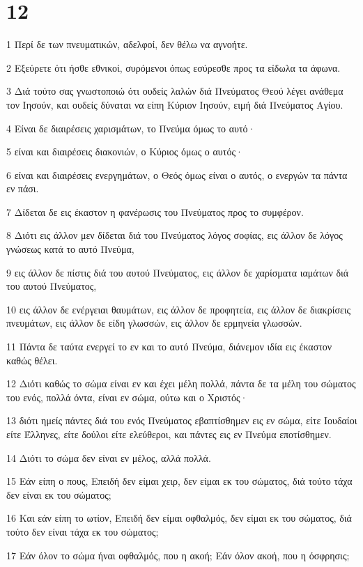 \chapter{12}

\par 1 Περί δε των πνευματικών, αδελφοί, δεν θέλω να αγνοήτε.
\par 2 Εξεύρετε ότι ήσθε εθνικοί, συρόμενοι όπως εσύρεσθε προς τα είδωλα τα άφωνα.
\par 3 Διά τούτο σας γνωστοποιώ ότι ουδείς λαλών διά Πνεύματος Θεού λέγει ανάθεμα τον Ιησούν, και ουδείς δύναται να είπη Κύριον Ιησούν, ειμή διά Πνεύματος Αγίου.
\par 4 Είναι δε διαιρέσεις χαρισμάτων, το Πνεύμα όμως το αυτό·
\par 5 είναι και διαιρέσεις διακονιών, ο Κύριος όμως ο αυτός·
\par 6 είναι και διαιρέσεις ενεργημάτων, ο Θεός όμως είναι ο αυτός, ο ενεργών τα πάντα εν πάσι.
\par 7 Δίδεται δε εις έκαστον η φανέρωσις του Πνεύματος προς το συμφέρον.
\par 8 Διότι εις άλλον μεν δίδεται διά του Πνεύματος λόγος σοφίας, εις άλλον δε λόγος γνώσεως κατά το αυτό Πνεύμα,
\par 9 εις άλλον δε πίστις διά του αυτού Πνεύματος, εις άλλον δε χαρίσματα ιαμάτων διά του αυτού Πνεύματος,
\par 10 εις άλλον δε ενέργειαι θαυμάτων, εις άλλον δε προφητεία, εις άλλον δε διακρίσεις πνευμάτων, εις άλλον δε είδη γλωσσών, εις άλλον δε ερμηνεία γλωσσών.
\par 11 Πάντα δε ταύτα ενεργεί το εν και το αυτό Πνεύμα, διάνεμον ιδία εις έκαστον καθώς θέλει.
\par 12 Διότι καθώς το σώμα είναι εν και έχει μέλη πολλά, πάντα δε τα μέλη του σώματος του ενός, πολλά όντα, είναι εν σώμα, ούτω και ο Χριστός·
\par 13 διότι ημείς πάντες διά του ενός Πνεύματος εβαπτίσθημεν εις εν σώμα, είτε Ιουδαίοι είτε Έλληνες, είτε δούλοι είτε ελεύθεροι, και πάντες εις εν Πνεύμα εποτίσθημεν.
\par 14 Διότι το σώμα δεν είναι εν μέλος, αλλά πολλά.
\par 15 Εάν είπη ο πους, Επειδή δεν είμαι χειρ, δεν είμαι εκ του σώματος, διά τούτο τάχα δεν είναι εκ του σώματος;
\par 16 Και εάν είπη το ωτίον, Επειδή δεν είμαι οφθαλμός, δεν είμαι εκ του σώματος, διά τούτο δεν είναι τάχα εκ του σώματος;
\par 17 Εάν όλον το σώμα ήναι οφθαλμός, που η ακοή; Εάν όλον ακοή, που η όσφρησις;
